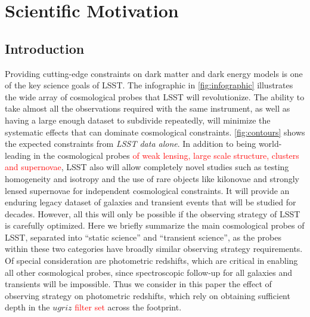 \documentclass[12pt, letterpaper]{article}
\newcommand{\review}[1]{{\textcolor{red}{#1}}}
\begin{document}
\clearpage

\section{Scientific Motivation}


\subsection{Introduction}
Providing cutting-edge constraints on dark matter and dark energy models is one of the key science goals of LSST. The infographic in \autoref{fig:infographic} illustrates the wide array of cosmological probes that LSST will revolutionize. The ability to take almost all the observations required with the same instrument, as well as having a large enough dataset to subdivide repeatedly, will minimize the systematic effects that can dominate cosmological constraints. \autoref{fig:contours} shows the expected constraints from \emph{LSST data alone}. In addition to being world-leading in the cosmological probes \review{of weak lensing, large scale structure, clusters and supernovae}, LSST also will allow completely novel studies such as testing homogeneity and isotropy and the use of rare objects like kilonovae and strongly lensed supernovae for independent cosmological constraints. It will provide an enduring legacy dataset of galaxies and transient events that will be studied for decades. However, all this will only be possible if the observing strategy of LSST is carefully optimized. Here we briefly summarize the main cosmological probes of LSST, separated into ``static science'' and ``transient science'', as the probes within these two categories have broadly similar observing strategy requirements. Of special consideration are photometric redshifts, which are critical in enabling all other cosmological probes, since spectroscopic follow-up for all galaxies and transients will be impossible. Thus we consider in this paper the effect of observing strategy on photometric redshifts, which rely on obtaining sufficient depth in the $ugriz$ \review{filter set} across the footprint.
\end{document}
